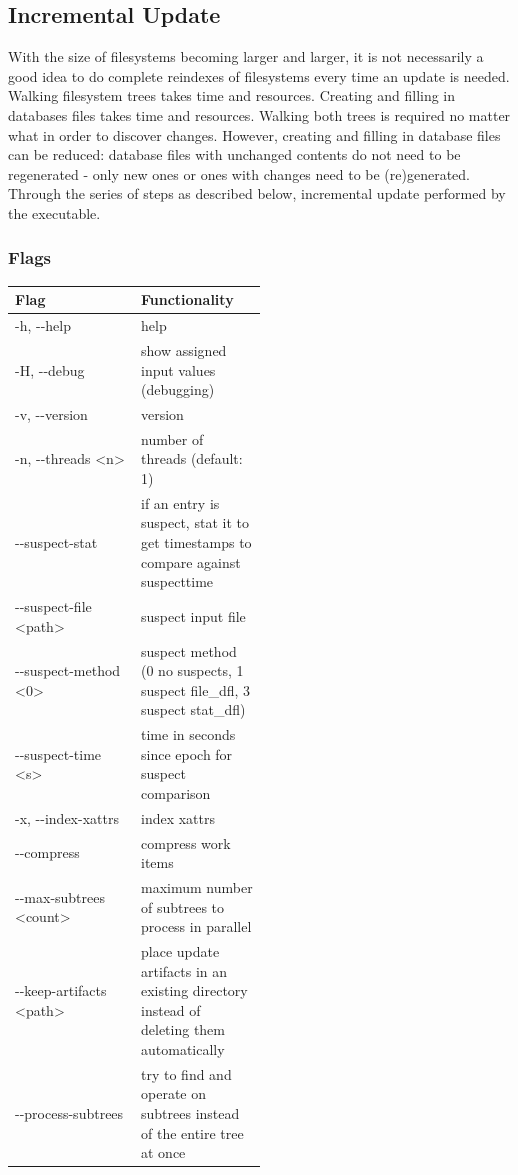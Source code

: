 \subsection{Incremental Update}
With the size of filesystems becoming larger and larger, it is not
necessarily a good idea to do complete reindexes of filesystems every
time an update is needed. Walking filesystem trees takes time and
resources. Creating and filling in databases files takes time and
resources. Walking both trees is required no matter what in order to
discover changes. However, creating and filling in database files can be
reduced: database files with unchanged contents do not need to be
regenerated - only new ones or ones with changes need to be
(re)generated. Through the series of steps as described below,
incremental update performed by the \gufiincrementalupdate executable.

\subsubsection{Flags}

\begin{longtable}{|l|p{0.5\linewidth}|}
  \hline
  Flag & Functionality \\
  \hline
  -h, -{}-help & help \\
  \hline
  -H, -{}-debug & show assigned input values (debugging) \\
  \hline
  -v, -{}-version & version \\
  \hline
  -n, -{}-threads \textless n\textgreater & number of threads (default: 1) \\
  \hline
  -{}-suspect-stat & if an entry is suspect,
  stat it to get timestamps to compare against suspecttime \\
  \hline
  -{}-suspect-file \textless path\textgreater & suspect input file \\
  \hline
  -{}-suspect-method \textless 0\textbar 1\textbar 3\textgreater & suspect method (0 no
  suspects, 1 suspect file\_dfl, 3 suspect stat\_dfl) \\
  \hline
  -{}-suspect-time \textless s\textgreater & time in seconds since epoch
  for suspect comparison \\
  \hline
  -x, -{}-index-xattrs & index xattrs \\
  \hline
  -{}-compress & compress work items \\
  \hline
  -{}-max-subtrees \textless count\textgreater & maximum number of subtrees to process in parallel \\
  \hline
  -{}-keep-artifacts \textless path\textgreater & place update artifacts in an existing directory instead of deleting them automatically \\
  \hline
  -{}-process-subtrees & try to find and operate on subtrees instead of the entire tree at once \\
  \hline
\end{longtable}

